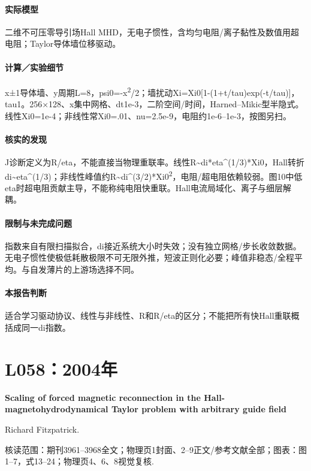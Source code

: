 \paragraph{实际模型}二维不可压零导引场Hall MHD，无电子惯性，含均匀电阻/离子黏性及数值用超电阻；Taylor导体墙位移驱动。

\paragraph{计算／实验细节}x±1导体墙、y周期L=8，psi0=-x\textsuperscript{2}/2；墙扰动Xi=Xi0[1-(1+t/tau)exp(-t/tau)]，tau1。256×128、x集中网格、dt1e-3，二阶空间/时间，Harned–Mikic型半隐式。线性Xi0=1e-4；非线性常Xi0=.01、nu=2.5e-9，电阻约1e-6–1e-3，按图另扫。

\paragraph{核实的发现}J诊断定义为R/eta，不能直接当物理重联率。线性R\textasciitilde{}di*eta\textasciicircum{}(1/3)*Xi0，Hall转折di\textasciitilde{}eta\textasciicircum{}(1/3)；非线性峰值约R\textasciitilde{}di\textasciicircum{}(3/2)*Xi0\textsuperscript{2}，电阻/超电阻依赖较弱。图10中低eta时超电阻贡献主导，不能称纯电阻快重联。Hall电流局域化、离子与细层解耦。

\paragraph{限制与未完成问题}指数来自有限扫描拟合，di接近系统大小时失效；没有独立网格/步长收敛数据。无电子惯性使极低耗散极限不可无限外推，短波正则化必要；峰值非稳态/全程平均。与自发薄片的上游场选择不同。

\paragraph{本报告判断}适合学习驱动协议、线性与非线性、R和R/eta的区分；不能把所有快Hall重联概括成同一di指数。

\section{L058：2004年}\label{paper:L058}

\textbf{Scaling of forced magnetic reconnection in the Hall-magnetohydrodynamical Taylor problem with arbitrary guide field}\citep{L058}\

Richard Fitzpatrick.

\textsf{核读范围：}期刊3961–3968全文；物理页1封面、2–9正文/参考文献全部；\textsf{图表：}图1–7，式13–24；物理页4、6、8视觉复核.

